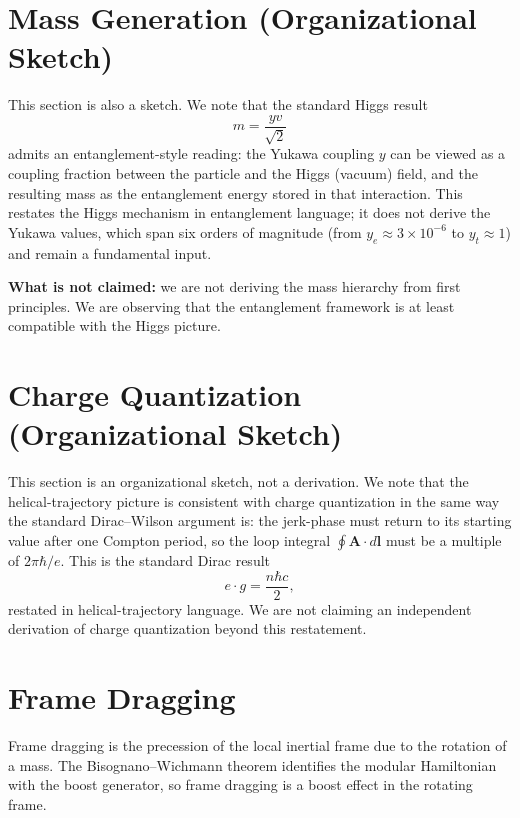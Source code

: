 \documentclass[11pt,letterpaper]{article}
\begin{document}
\section{Mass Generation (Organizational Sketch)}

This section is also a sketch. We note that the standard Higgs result
\begin{equation}
  m = \frac{y v}{\sqrt{2}}
  \label{eq:yukawa_mass}
\end{equation}
admits an entanglement-style reading: the Yukawa coupling $y$ can be
viewed as a coupling fraction between the particle and the Higgs (vacuum)
field, and the resulting mass as the entanglement energy stored in
that interaction. This restates the Higgs mechanism in entanglement
language; it does not derive the Yukawa values, which span six orders
of magnitude (from $y_e \approx 3 \times 10^{-6}$ to $y_t \approx 1$)
and remain a fundamental input.

\textbf{What is not claimed:} we are not deriving the mass hierarchy
from first principles. We are observing that the entanglement
framework is at least compatible with the Higgs picture.

\section{Charge Quantization (Organizational Sketch)}

This section is an organizational sketch, not a derivation. We note
that the helical-trajectory picture is consistent with charge
quantization in the same way the standard Dirac--Wilson argument is:
the jerk-phase must return to its starting value after one Compton
period, so the loop integral $\oint \mathbf{A}\cdot d\mathbf{l}$ must
be a multiple of $2\pi\hbar/e$. This is the standard Dirac result
\begin{equation}
  e \cdot g = \frac{n \hbar c}{2},
  \label{eq:dirac_quant}
\end{equation}
restated in helical-trajectory language. We are not claiming an
independent derivation of charge quantization beyond this restatement.

\section{Frame Dragging}

Frame dragging is the precession of the local inertial frame due to the rotation of a mass. The Bisognano--Wichmann theorem identifies the modular Hamiltonian with the boost generator, so frame dragging is a boost effect in the rotating frame.
\end{document}
